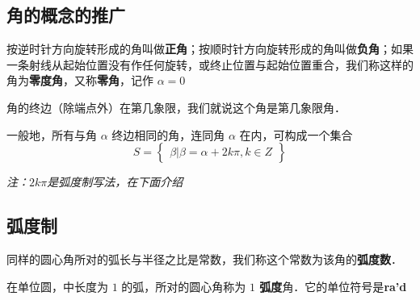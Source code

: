 
\begin{issues}
\issueDraft
\end{issues}

\subsection{角的概念的推广}
按逆时针方向旋转形成的角叫做\textbf{正角}；按顺时针方向旋转形成的角叫做\textbf{负角}；如果一条射线从起始位置没有作任何旋转，或终止位置与起始位置重合，我们称这样的角为\textbf{零度角}，又称\textbf{零角}，记作 $\alpha = 0$

角的终边（除端点外）在第几象限，我们就说这个角是第几象限角．

一般地，所有与角 $\alpha$ 终边相同的角，连同角 $\alpha$ 在内，可构成一个集合
\begin{equation}
S = \begin{Bmatrix} \beta|\beta=\alpha+2k\pi,k \in Z \end{Bmatrix}
\end{equation}

\textsl{注：$2k\pi$是弧度制写法，在下面介绍}

\subsection{弧度制}
同样的圆心角所对的弧长与半径之比是常数，我们称这个常数为该角的\textbf{弧度数}．

在单位圆，中长度为 $1$ 的弧，所对的圆心角称为 \textbf{$1$ 弧度}角．它的单位符号是\textbf{ra'd}
